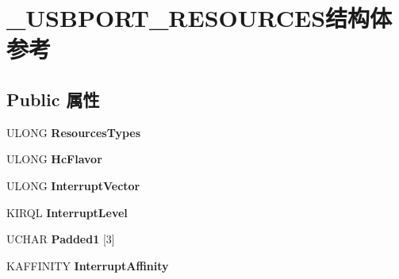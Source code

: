 \hypertarget{struct___u_s_b_p_o_r_t___r_e_s_o_u_r_c_e_s}{}\section{\+\_\+\+U\+S\+B\+P\+O\+R\+T\+\_\+\+R\+E\+S\+O\+U\+R\+C\+E\+S结构体 参考}
\label{struct___u_s_b_p_o_r_t___r_e_s_o_u_r_c_e_s}
\subsection*{Public 属性}
\begin{DoxyCompactItemize}
\item 
\mbox{\label{struct___u_s_b_p_o_r_t___r_e_s_o_u_r_c_e_s_a0de695c22ff6463ed0547a151407650a}} 
U\+L\+O\+NG {\bfseries Resources\+Types}
\item 
\mbox{\label{struct___u_s_b_p_o_r_t___r_e_s_o_u_r_c_e_s_a568b542942fb58fcc2f4ae616f305e28}} 
U\+L\+O\+NG {\bfseries Hc\+Flavor}
\item 
\mbox{\label{struct___u_s_b_p_o_r_t___r_e_s_o_u_r_c_e_s_aa872867b6cdf2e7b648556d37b900ee4}} 
U\+L\+O\+NG {\bfseries Interrupt\+Vector}
\item 
\mbox{\label{struct___u_s_b_p_o_r_t___r_e_s_o_u_r_c_e_s_aee7c6ea0eb9f3106c102a31f44c0180b}} 
K\+I\+R\+QL {\bfseries Interrupt\+Level}
\item 
\mbox{\label{struct___u_s_b_p_o_r_t___r_e_s_o_u_r_c_e_s_a37eae63b40bc15a262163c85e5470034}} 
U\+C\+H\+AR {\bfseries Padded1} \mbox{[}3\mbox{]}
\item 
\mbox{\label{struct___u_s_b_p_o_r_t___r_e_s_o_u_r_c_e_s_a6eca3a5283745a873dafda279692558f}} 
K\+A\+F\+F\+I\+N\+I\+TY {\bfseries Interrupt\+Affinity}
\item 
\mbox{\label{struct___u_s_b_p_o_r_t___r_e_s_o_u_r_c_e_s_ab43230aff805de9749f7c75925c287d1}} 

\end{DoxyCompactItemize}
